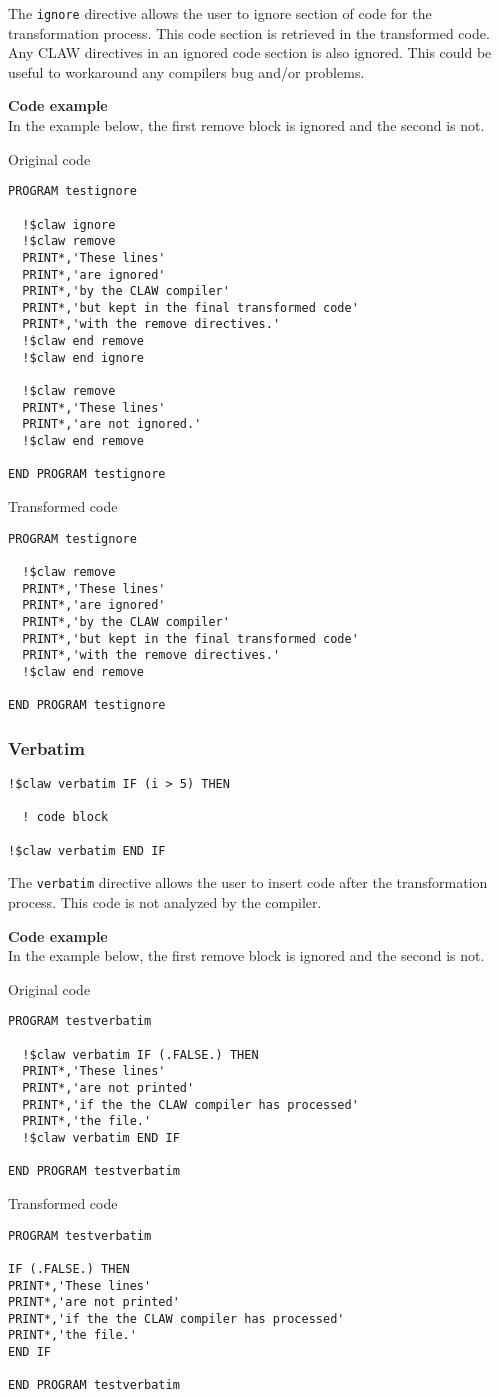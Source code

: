 The \lstinline!ignore! directive allows the user to ignore section of code
for the transformation process. This code section is retrieved in the
transformed code. Any CLAW directives in an ignored code section is also
ignored. This could be useful to workaround any compilers bug and/or problems.

\textbf{Code example}\\
\label{ignore1}
In the example below, the first remove block is ignored and the second is not.

Original code
\begin{lstlisting}
PROGRAM testignore

  !$claw ignore
  !$claw remove
  PRINT*,'These lines'
  PRINT*,'are ignored'
  PRINT*,'by the CLAW compiler'
  PRINT*,'but kept in the final transformed code'
  PRINT*,'with the remove directives.'
  !$claw end remove
  !$claw end ignore

  !$claw remove
  PRINT*,'These lines'
  PRINT*,'are not ignored.'
  !$claw end remove

END PROGRAM testignore
\end{lstlisting}

Transformed code
\begin{lstlisting}
PROGRAM testignore

  !$claw remove
  PRINT*,'These lines'
  PRINT*,'are ignored'
  PRINT*,'by the CLAW compiler'
  PRINT*,'but kept in the final transformed code'
  PRINT*,'with the remove directives.'
  !$claw end remove

END PROGRAM testignore
\end{lstlisting}

\subsubsection{Verbatim}
\begin{lstlisting}
!$claw verbatim IF (i > 5) THEN

  ! code block

!$claw verbatim END IF
\end{lstlisting}

The \lstinline!verbatim! directive allows the user to insert code after the
transformation process. This code is not analyzed by the compiler.

\textbf{Code example}\\
\label{verbatim1}
In the example below, the first remove block is ignored and the second is not.

Original code
\begin{lstlisting}
PROGRAM testverbatim

  !$claw verbatim IF (.FALSE.) THEN
  PRINT*,'These lines'
  PRINT*,'are not printed'
  PRINT*,'if the the CLAW compiler has processed'
  PRINT*,'the file.'
  !$claw verbatim END IF

END PROGRAM testverbatim
\end{lstlisting}

Transformed code
\begin{lstlisting}
PROGRAM testverbatim

IF (.FALSE.) THEN
PRINT*,'These lines'
PRINT*,'are not printed'
PRINT*,'if the the CLAW compiler has processed'
PRINT*,'the file.'
END IF

END PROGRAM testverbatim
\end{lstlisting}
